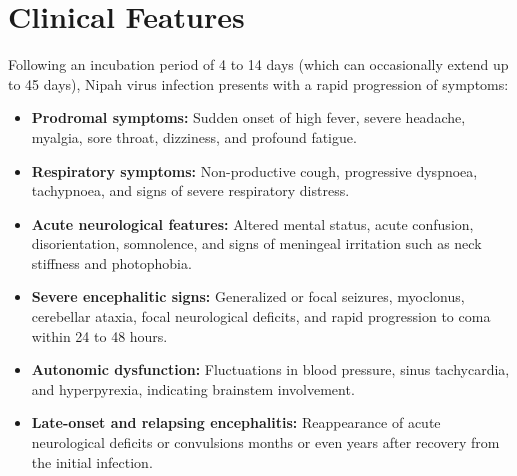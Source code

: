 \section*{Clinical Features}
Following an incubation period of 4 to 14 days (which can occasionally extend up to 45 days), Nipah virus infection presents with a rapid progression of symptoms:
\begin{itemize}
    \item \textbf{Prodromal symptoms:} Sudden onset of high fever, severe headache, myalgia, sore throat, dizziness, and profound fatigue.
    \item \textbf{Respiratory symptoms:} Non-productive cough, progressive dyspnoea, tachypnoea, and signs of severe respiratory distress.
    \item \textbf{Acute neurological features:} Altered mental status, acute confusion, disorientation, somnolence, and signs of meningeal irritation such as neck stiffness and photophobia.
    \item \textbf{Severe encephalitic signs:} Generalized or focal seizures, myoclonus, cerebellar ataxia, focal neurological deficits, and rapid progression to coma within 24 to 48 hours.
    \item \textbf{Autonomic dysfunction:} Fluctuations in blood pressure, sinus tachycardia, and hyperpyrexia, indicating brainstem involvement.
    \item \textbf{Late-onset and relapsing encephalitis:} Reappearance of acute neurological deficits or convulsions months or even years after recovery from the initial infection.
\end{itemize}


